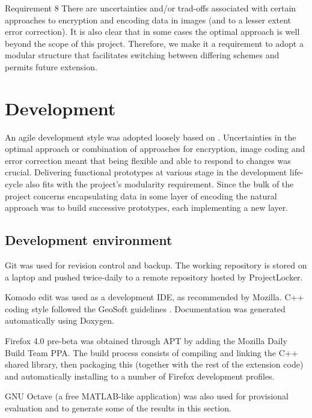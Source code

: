 \begin{desc}
    \item[Requirement 8] There are uncertainties and/or trad-offs associated with certain approaches to encryption and encoding data in images (and to a lesser extent error correction). It is also clear that in some cases the optimal approach is well beyond the scope of this project. Therefore, we make it a requirement to adopt a modular structure that facilitates switching between differing schemes and permits future extension.
    
\end{desc}


   
\FloatBarrier 
\section{Development}
        
An agile development style was adopted loosely based on \cite{agile}. Uncertainties in the optimal approach or combination of approaches for encryption, image coding and error correction meant that being flexible and able to respond to changes was crucial. Delivering functional prototypes at various stage in the development life-cycle also fits with the project's modularity requirement. Since the bulk of the project concerns encapsulating data in some layer of encoding the natural approach was to build successive prototypes, each implementing a new layer.

\subsection{Development environment}

Git was used for revision control and backup. The working repository is stored on a laptop and pushed twice-daily to a remote repository hosted by ProjectLocker.

Komodo edit was used as a development IDE, as recommended by Mozilla. C++ coding style followed the GeoSoft guidelines \cite{code-style}. Documentation was generated automatically using Doxygen.

Firefox 4.0 pre-beta was obtained through APT by adding the Mozilla Daily Build Team PPA. The build process consists of compiling and linking the C++ shared library, then packaging this (together with the rest of the extension code) and automatically installing to a number of Firefox development profiles.        

GNU Octave (a free MATLAB-like application) was also used for provisional evaluation and to generate some of the results in this section.



